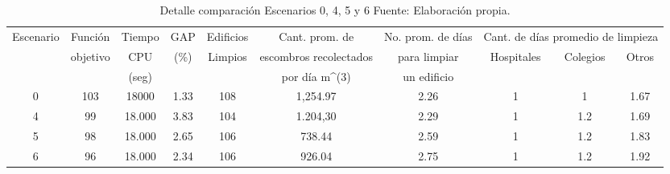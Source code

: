 \documentclass[12pt,a4paper]{article}
\begin{document}
\begin{table}[h!]
\resizebox{15cm}{!} {
\begin{tabular}{c|c|c|c|c|c|c|c|c|c}
\hline
\multirow{3}{*}{Escenario} & Función                   & Tiempo & GAP                   & Edificios                & Cant. prom. de                 & No. prom. de días & \multicolumn{3}{c|}{Cant. de días promedio de limpieza}                          \\ \cline{8-10} 
                           & \multirow{2}{*}{objetivo} & CPU    & \multirow{2}{*}{(\%)} & \multirow{2}{*}{Limpios} & escombros recolectados         & para limpiar      & \multirow{2}{*}{Hospitales} & \multirow{2}{*}{Colegios} & \multirow{2}{*}{Otros} \\
                           &                           & (seg)  &                       &                          & por día m\textasciicircum{}(3) & un edificio       &                             &                           &                        \\ \hline
0                          & 103                       & 18000  & 1.33                  & 108                      & 1,254.97                       & 2.26              & 1                           & 1                         & 1.67                   \\ 
4                          & 99                        & 18.000 & 3.83                  & 104                      & 1.204,30                       & 2.29              & 1                           & 1.2                       & 1.69                   \\ 
5                          & 98                        & 18.000 & 2.65                  & 106                      & 738.44                         & 2.59              & 1                           & 1.2                       & 1.83                   \\ 
6                          & 96                        & 18.000 & 2.34                  & 106                      & 926.04                         & 2.75              & 1                           & 1.2                       & 1.92                   \\ \hline
\end{tabular}
}
\caption{Detalle comparación Escenarios 0, 4, 5 y 6 Fuente: Elaboración propia. }
\label{tab:comp03}
\end{table}

\end{document}
